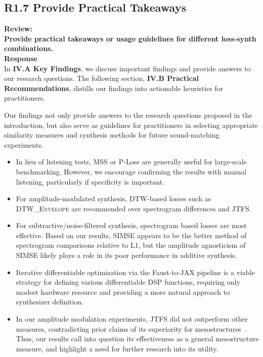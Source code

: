 \documentclass[11pt]{article}
\newcommand{\DTWEnv}{\textsc{DTW\_Envelope}}
\newcommand{\JTFS}{\textsc{JTFS}}
\begin{document}
\subsection{R1.7 Provide Practical Takeaways}
\label{R1.7}
\noindent\textbf{Review:} \\
\noindent \textbf{Provide practical takeaways or usage guidelines for different loss-synth combinations. } 
\\

\noindent\textbf{Response} \\
In \textbf{IV.A Key Findings}, we discuss important findings and provide answers to our research questions. The following section, \textbf{IV.B Practical Recommendations}, distills our findings into actionable heuristics for practitioners. 

\begin{displayquote}
    Our findings not only provide answers to the research questions proposed in the introduction, but also serve as guidelines for practitioners in selecting appropriate similarity measures and synthesis methods for future sound-matching experiments.
\begin{itemize}
    \item In lieu of listening tests, MSS or P-Loss are generally useful for large-scale benchmarking. However, we encourage confirming the results with manual listening, particularly if specificity is important. 
    \item For amplitude-modulated synthesis, DTW-based losses such as \DTWEnv{} are recommended over spectrogram differences and JTFS.
    \item  For subtractive/noise-filtered synthesis, spectrogram based losses are most effective. Based on our results, SIMSE appears to be the better method of spectrogram comparisons relative to L1, but the amplitude agnosticism of SIMSE likely plays a role in its poor performance in additive synthesis.
    \item Iterative differentiable optimization via the Faust-to-JAX pipeline is a viable strategy for defining various differentiable DSP functions, requiring only modest hardware resource and providing a more natural approach to synthesizer definition.
    \item In our amplitude modulation experiments, \JTFS{} did not outperform other measures, contradicting prior claims of its superiority for mesostructures~\cite{vahidi2023mesostructures}. Thus, our results call into question its effectiveness as a general mesostructure measure, and highlight a need for further research into its utility.
\end{itemize}

\end{displayquote}
\end{document}
